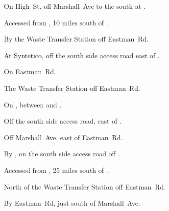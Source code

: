 
\begin{LocationList}

On High~St, off  Marshall~Ave to the south at .

Accessed from , 10 miles south of .

By the Waste Transfer Station off  Eastman~Rd.

At Syntetico, off the  south side access road east of .

On  Eastman~Rd.

The Waste Transfer Station off  Eastman~Rd.

On , between  and .

Off the  south side access road, east of .

Off  Marshall~Ave, east of  Eastman~Rd.

\Location{\TruckStop \Gas \Rest \Service \Weigh}
By  , on the south side access road off .

Accessed from , 25 miles south of .

North of the Waste Transfer Station off  Eastman~Rd.

By  Eastman~Rd, just south of  Marshall~Ave.

\end{LocationList}

